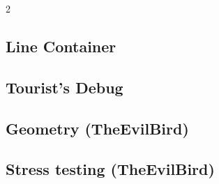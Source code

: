 \documentclass[a4paper]{article}
\begin{document}
\begin{multicols*}{2}
        \subsection{Line Container}
            
        
        \subsection{Tourist's Debug}
            
        
        \subsection{Geometry (TheEvilBird)}
            

        \subsection{Stress testing (TheEvilBird)}
            
    
\end{multicols*}
\end{document}
